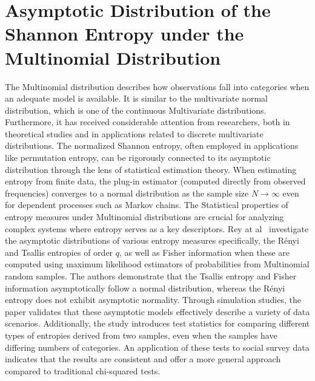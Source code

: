 \section {Asymptotic Distribution of the Shannon Entropy under the Multinomial Distribution}

The Multinomial distribution describes how observations fall into categories when an adequate model is available. It is similar to the multivariate normal distribution, which is one of the continuous Multivariate distributions. Furthermore, it has received considerable attention from researchers, both in theoretical studies and in applications related to discrete multivariate distributions. 
The normalized Shannon entropy, often employed in applications like permutation entropy, can be rigorously connected to its asymptotic distribution through the lens of statistical estimation theory. When estimating entropy from finite data, the plug-in estimator (computed directly from observed frequencies) converges to a normal distribution as the sample size $N\longrightarrow \infty$ even for dependent processes such as Markov chains. 
The Statistical properties of entropy measures under Multinomial distributions are crucial for analyzing complex systems where entropy serves as a key descriptors. Rey at al~\cite{Rey2023} investigate the asymptotic distributions of various entropy measures specifically, the Rényi and Tsallis entropies of order $q$, as well as Fisher information when these are computed using maximum likelihood estimators of probabilities from Multinomial random samples. The authors demonstrate that the Tsallis entropy and Fisher information asymptotically follow a normal distribution, whereas the Rényi entropy does not exhibit asymptotic normality. Through simulation studies, the paper validates that these asymptotic models effectively describe a variety of data scenarios. Additionally, the study introduces test statistics for comparing different types of entropies derived from two samples, even when the samples have differing numbers of categories. An application of these tests to social survey data indicates that the results are consistent and offer a more general approach compared to traditional chi-squared tests. 

